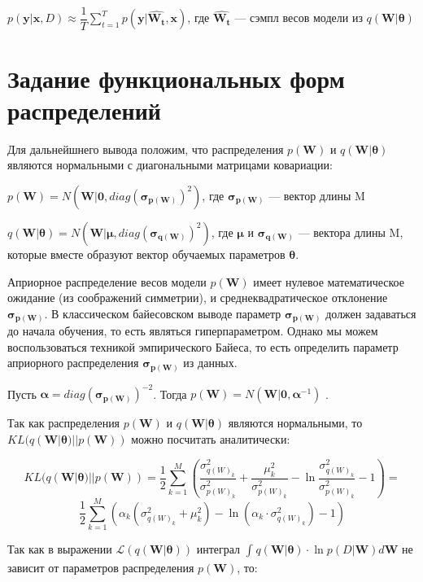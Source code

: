 \documentclass{article}
\begin{document}
$
p(\mathbf{y} | \mathbf{x}, D)
\approx \dfrac{1}{T} \sum_{t=1}^{T}{p(\mathbf{y} | \hat{\mathbf{W_t}}, \mathbf{x})}
$, где $\hat{\mathbf{W_t}}$ --- сэмпл весов модели из $q(\mathbf{W} | \pmb{\theta})$

\section{Задание функциональных форм распределений}
Для дальнейшнего вывода положим, что распределения $p(\mathbf{W})$ и $q(\mathbf{W} | \pmb{\theta})$ являются нормальными с диагональными матрицами ковариации:

$
p(\mathbf{W}) =
N(\mathbf{W} | \mathbf{0}, diag(\pmb{\sigma_{p(\mathbf{W})}})^{2})$,
где $\pmb{\sigma_{p(\mathbf{W})}}$ — вектор длины M

$q(\mathbf{W} | \pmb{\theta}) = N(\mathbf{W} | \pmb{\mu}, diag(\pmb{\sigma_{q(\mathbf{W})}})^{2})$, где $\pmb{\mu}$ и $\pmb{\sigma_{q(\mathbf{W})}}$ — вектора длины M, которые вместе образуют вектор обучаемых параметров $\pmb{\theta}$.

Априорное распределение весов модели $p(\mathbf{W})$ имеет нулевое математическое ожидание (из соображений симметрии), и среднеквадратическое отклонение $\pmb{\sigma_{p(\mathbf{W})}}$. В классическом байесовском выводе параметр $\pmb{\sigma_{p(\mathbf{W})}}$ должен задаваться до начала обучения, то есть являться гиперпараметром. Однако мы можем воспользоваться техникой эмпирического Байеса, то есть определить параметр  априорного распределения $\pmb{\sigma_{p(\mathbf{W})}}$ из данных.

Пусть $\pmb{\alpha} = diag(\pmb{\sigma_{p(\mathbf{W})}})^{-2}$. Тогда
$
p(\mathbf{W}) =
N(\mathbf{W} | \mathbf{0}, \pmb{\alpha}^{-1})$
.

Так как распределения $p(\mathbf{W})$ и $q(\mathbf{W} | \pmb{\theta})$ являются нормальными, то $KL(q(\mathbf{W} | \pmb{\theta}) || p(\mathbf{W}))$ можно посчитать аналитически:

\[
KL(q(\mathbf{W} | \pmb{\theta}) || p(\mathbf{W})) =
\dfrac{1}{2}\sum_{k=1}^{M}(\dfrac{\sigma_{{q(W)_{k}}}^2}{\sigma_{{p(W)_{k}}}^2} + \dfrac{\mu_{k}^2}{\sigma_{{p(W)_{k}}}^2} - \ln{\dfrac{\sigma_{{q(W)_{k}}}^2}{\sigma_{{p(W)_{k}}}^2}} - 1) =
\]\[
\dfrac{1}{2}\sum_{k=1}^{M}(\alpha_k (\sigma_{{q(W)_{k}}}^2 + \mu_{k}^2) - \ln{(\alpha_k \cdot \sigma_{{q(W)_{k}}}^2)} - 1)
\]

Так как в выражении
$\mathcal{L}(q(\mathbf{W} | \pmb{\theta}))$
интеграл
$\int_{}{} q(\mathbf{W} | \pmb{\theta}) \cdot \ln{p(D | \mathbf{W})} d\mathbf{W}$
не зависит от параметров распределения $p(\mathbf{W})$, то:
\end{document}
